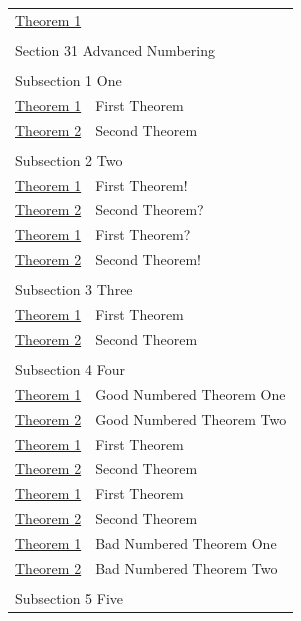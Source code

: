 \documentclass{sn-jnl}
\theoremstyle{thmstyleone}%
\theoremstyle{thmstyletwo}%
\theoremstyle{thmstylethree}%
\numberwithin{equation}{section}
\begin{document}
\begin{appendices}
\begin{longtable}[l]{ll}
\hyperref[theorem-detached]{Theorem 1}& \\
\multicolumn{2}{l}{\null}\\[1.5ex] \multicolumn{2}{l}{\large Section 31 Advanced Numbering}\\[0.5ex]
\multicolumn{2}{l}{\null}\\[1.5ex] \multicolumn{2}{l}{\large Subsection 1 One}\\[0.5ex]
\hyperref[theorem-number-01]{Theorem 1}& First Theorem\\
\hyperref[theorem-number-02]{Theorem 2}& Second Theorem\\
\multicolumn{2}{l}{\null}\\[1.5ex] \multicolumn{2}{l}{\large Subsection 2 Two}\\[0.5ex]
\hyperref[theorem-number-03]{Theorem 1}& First Theorem!\\
\hyperref[theorem-number-04]{Theorem 2}& Second Theorem?\\
\hyperref[theorem-number-05]{Theorem 1}& First Theorem?\\
\hyperref[theorem-number-06]{Theorem 2}& Second Theorem!\\
\multicolumn{2}{l}{\null}\\[1.5ex] \multicolumn{2}{l}{\large Subsection 3 Three}\\[0.5ex]
\hyperref[theorem-number-07]{Theorem 1}& First Theorem\\
\hyperref[theorem-number-08]{Theorem 2}& Second Theorem\\
\multicolumn{2}{l}{\null}\\[1.5ex] \multicolumn{2}{l}{\large Subsection 4 Four}\\[0.5ex]
\hyperref[theorem-good-one]{Theorem 1}& Good Numbered Theorem One\\
\hyperref[theorem-good-two]{Theorem 2}& Good Numbered Theorem Two\\
\hyperref[theorem-number-09]{Theorem 1}& First Theorem\\
\hyperref[theorem-number-10]{Theorem 2}& Second Theorem\\
\hyperref[theorem-number-11]{Theorem 1}& First Theorem\\
\hyperref[theorem-number-12]{Theorem 2}& Second Theorem\\
\hyperref[theorem-bad-one]{Theorem 1}& Bad Numbered Theorem One\\
\hyperref[theorem-bad-two]{Theorem 2}& Bad Numbered Theorem Two\\
\multicolumn{2}{l}{\null}\\[1.5ex] \multicolumn{2}{l}{\large Subsection 5 Five}\\[0.5ex]

\end{longtable}
\end{appendices}
\end{document}
